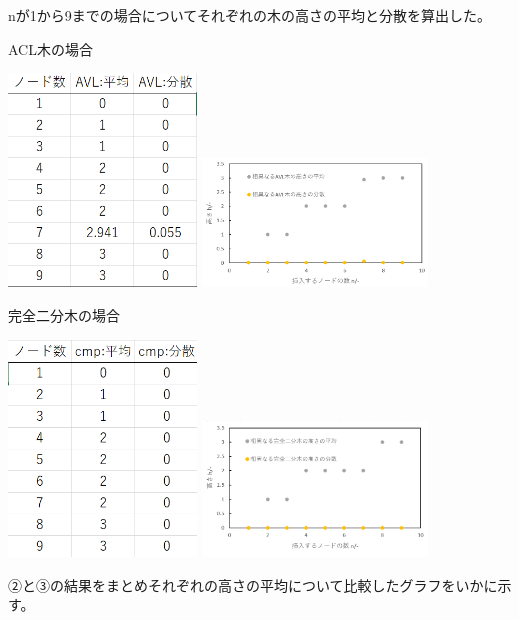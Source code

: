 \documentclass{ltjsarticle}
\begin{document}
nが1から9までの場合についてそれぞれの木の高さの平均と分散を算出した。

\textrm{ACL木の場合}

\begin{center}
\includegraphics[width=5cm]{avl_t.png}
\includegraphics[width=6cm]{avl_g.png}
\end{center}

\textrm{完全二分木の場合}

\begin{center}
\includegraphics[width=5cm]{cmp_t.png}
\includegraphics[width=6cm]{cmp_g.png}
\end{center}

➁と➂の結果をまとめそれぞれの高さの平均について比較したグラフをいかに示す。
\end{document}
